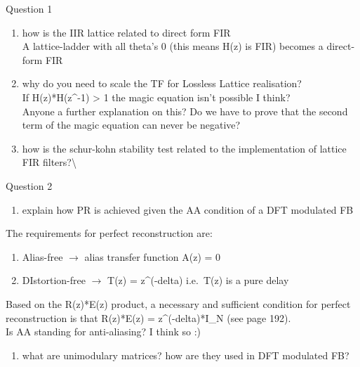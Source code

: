 \documentclass[
  a4paper,
  ,captions=tableheading
]{scrartcl}
\providecommand{\tightlist}{%
  \setlength{\itemsep}{0pt}\setlength{\parskip}{0pt}}
\begin{document}
Question 1

\begin{enumerate}
\def\labelenumi{\arabic{enumi}.}
\tightlist
\item
  how is the IIR lattice related to direct form FIR\\
  A lattice-ladder with all theta's 0 (this means H(z) is FIR) becomes a
  direct-form FIR\\
\item
  why do you need to scale the TF for Lossless Lattice realisation?\\
  If H(z)*H(z\^{}-1) \textgreater{} 1 the magic equation isn't possible
  I think?\\
  Anyone a further explanation on this? Do we have to prove that the
  second term of the magic equation can never be negative?\\
\item
  how is the schur-kohn stability test related to the implementation of
  lattice FIR filters?\textbackslash{}
\end{enumerate}

Question 2

\begin{enumerate}
\def\labelenumi{\arabic{enumi}.}
\tightlist
\item
  explain how PR is achieved given the AA condition of a DFT modulated
  FB
\end{enumerate}

The requirements for perfect reconstruction are:

\begin{enumerate}
\def\labelenumi{\arabic{enumi})}
\tightlist
\item
  Alias-free \(\rightarrow\) alias transfer function A(z) = 0\\
\item
  DIstortion-free \(\rightarrow\) T(z) = z\^{}(-delta) i.e.~T(z) is a
  pure delay
\end{enumerate}

Based on the R(z)*E(z) product, a necessary and sufficient condition for
perfect reconstruction is that R(z)*E(z) = z\^{}(-delta)*I\_N (see page
192).\\
Is AA standing for anti-aliasing? I think so :)

\begin{enumerate}
\def\labelenumi{\arabic{enumi}.}
\setcounter{enumi}{1}
\tightlist
\item
  what are unimodulary matrices? how are they used in DFT modulated FB?
\end{enumerate}
\end{document}
